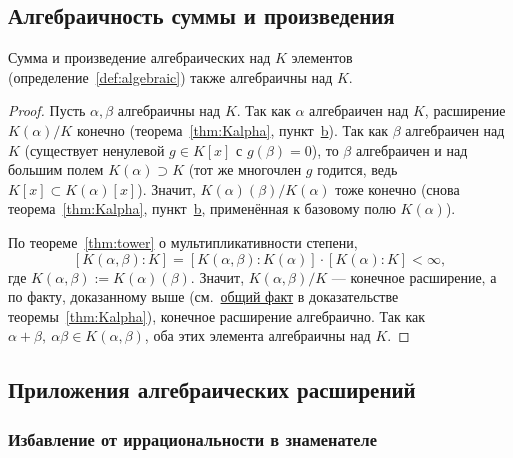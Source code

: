\documentclass[12pt]{article}
\begin{document}
    \subsection{Алгебраичность суммы и произведения}
    
    \begin{theorem}\label{thm:sum-product}
    	Сумма и произведение алгебраических над $K$ элементов (определение~\ref{def:algebraic}) также алгебраичны над $K$.
    \end{theorem}
    \begin{proof}
    	Пусть $\alpha, \beta$ алгебраичны над $K$. Так как $\alpha$ алгебраичен над $K$, расширение $K(\alpha)/K$ конечно (теорема~\ref{thm:Kalpha}, пункт~\hyperref[thm:Kalpha-b]{b}). Так как $\beta$ алгебраичен над $K$ (существует ненулевой $g \in K[x]$ с $g(\beta)=0$), то $\beta$ алгебраичен и над большим полем $K(\alpha) \supset K$ (тот же многочлен $g$ годится, ведь $K[x] \subset K(\alpha)[x]$). Значит, $K(\alpha)(\beta)/K(\alpha)$ тоже конечно (снова теорема~\ref{thm:Kalpha}, пункт~\hyperref[thm:Kalpha-b]{b}, применённая к базовому полю $K(\alpha)$).
    
    	По теореме~\ref{thm:tower} о мультипликативности степени,
    	\[
    	[K(\alpha,\beta):K] = [K(\alpha,\beta):K(\alpha)]\cdot[K(\alpha):K] < \infty,
    	\]
    	где $K(\alpha,\beta) := K(\alpha)(\beta)$. Значит, $K(\alpha,\beta)/K$ --- конечное расширение, а по факту, доказанному выше (см.~\hyperref[lem:finite-algebraic]{общий факт} в доказательстве теоремы~\ref{thm:Kalpha}), конечное расширение алгебраично. Так как $\alpha+\beta, \ \alpha\beta \in K(\alpha,\beta)$, оба этих элемента алгебраичны над $K$.
    \end{proof}
    
    \subsection{Приложения алгебраических расширений}
    
    \subsubsection{Избавление от иррациональности в знаменателе}
    
\end{document}
